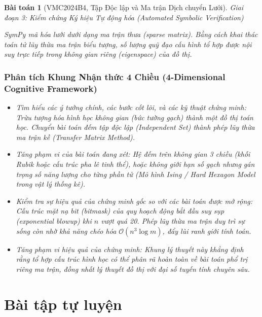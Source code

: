 \documentclass{article}
\newtheorem{baitoan}{Bài toán}
\begin{document}
\begin{baitoan}[VMC2024B4, Tập Độc lập và Ma trận Dịch chuyển Lưới]


\vspace{0.5em}\noindent\emph{Giai đoạn 3: Kiểm chứng Ký hiệu Tự động hóa (Automated Symbolic Verification)}
 
 \textsf{SymPy} mã hóa lưới dưới dạng ma trận thưa (sparse matrix). Bằng cách khai thác toán tử lũy thừa ma trận biểu tượng, số lượng quỹ đạo cấu hình tổ hợp được nội suy trực tiếp trong không gian riêng (eigenspace) của đồ thị.



 \subsubsection*{Phân tích Khung Nhận thức 4 Chiều (4-Dimensional Cognitive Framework)}
 \begin{itemize}
 \item \textit{Tìm hiểu các ý tưởng chính, các bước cốt lõi, và các kỹ thuật chứng minh}: Trừu tượng hóa hình học không gian (bức tường gạch) thành một đồ thị toán học. Chuyển bài toán đếm tập độc lập (Independent Set) thành phép lũy thừa ma trận kề (Transfer Matrix Method).
 \item \textit{Tăng phạm vi của bài toán đang xét}: Hệ đếm trên không gian 3 chiều (khối Rubik hoặc cấu trúc pha lê tinh thể), hoặc không giới hạn số gạch nhưng gán trọng số năng lượng cho từng phần tử (Mô hình Ising / Hard Hexagon Model trong vật lý thống kê).
 \item \textit{Kiểm tra sự hiệu quả của chứng minh gốc so với các bài toán được mở rộng}: Cấu trúc mặt nạ bit (bitmask) của quy hoạch động bắt đầu suy sụp (exponential blowup) khi $n$ vượt quá 20. Phép lũy thừa ma trận duy trì sự sống còn nhờ khả năng chéo hóa $\mathcal{O}(n^3 \log m)$, đẩy lùi ranh giới tính toán.
 \item \textit{Tăng phạm vi hiệu quả của chứng minh}: Khung lý thuyết này khẳng định rằng tổ hợp cấu trúc hình học có thể phân rã hoàn toàn về bài toán phổ trị riêng ma trận, đồng nhất lý thuyết đồ thị với đại số tuyến tính chuyên sâu.
 \end{itemize}
\end{baitoan}



\section{Bài tập tự luyện}
\end{document}
